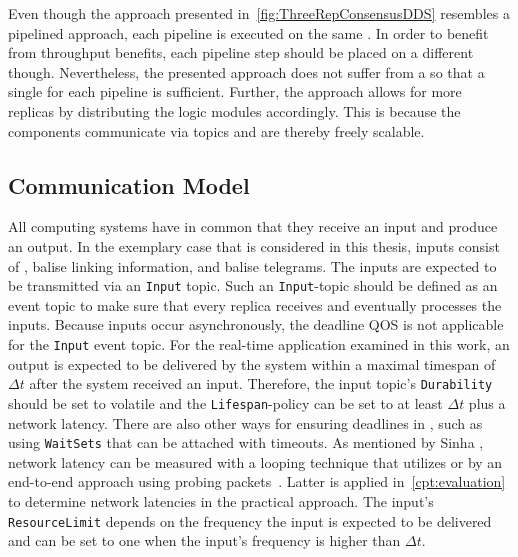 Even though the approach presented in~\autoref{fig:ThreeRepConsensusDDS} resembles a pipelined approach, each pipeline is executed on the same .
In order to benefit from throughput benefits, each pipeline step should be placed on a different  though.
Nevertheless, the presented approach does not suffer from a \ChallengeThrough so that a single  for each pipeline is sufficient.
Further, the approach allows for more replicas by distributing the logic modules accordingly.
This is because the components communicate via  topics and are thereby freely scalable.

\subsection{Communication Model}
All computing systems have in common that they receive an input and produce an output.
In the exemplary case that is considered in this thesis, inputs consist of , balise linking information, and balise telegrams.
The inputs are expected to be transmitted via an \texttt{Input}  topic.
Such an \texttt{Input}-topic should be defined as an event topic to make sure that every replica receives and eventually processes the inputs.
Because inputs occur asynchronously, the deadline \gls*{QOS} is not applicable for the \texttt{Input} event topic.
For the real-time application examined in this work, an output is expected to be delivered by the system within a maximal timespan of $\Delta t$ after the system received an input.
Therefore, the input topic's \texttt{Durability} should be set to volatile and the \texttt{Lifespan}-policy can be set to at least $\Delta t$ plus a network latency.
There are also other ways for ensuring deadlines in , such as using \texttt{WaitSets} that can be attached with timeouts.
As mentioned by Sinha \etal, network latency can be measured with a looping technique that utilizes   or by an end-to-end approach using probing packets~\cite{SinhaMeasureNetworkLatency}.
Latter is applied in~\autoref{cpt:evaluation} to determine network latencies in the practical approach.
The input's \texttt{ResourceLimit} depends on the frequency the input is expected to be delivered and can be set to one when the input's frequency is higher than $\Delta t$.
\\

